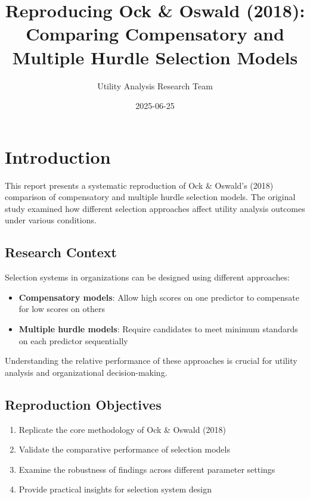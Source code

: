 \documentclass[
]{article}
\title{Reproducing Ock \& Oswald (2018): Comparing Compensatory and
Multiple Hurdle Selection Models}
\author{Utility Analysis Research Team}
\date{2025-06-25}
\providecommand{\tightlist}{%
  \setlength{\itemsep}{0pt}\setlength{\parskip}{0pt}}
\begin{document}
\maketitle

{
\setcounter{tocdepth}{3}
\tableofcontents
}
\section{Introduction}\label{introduction}

This report presents a systematic reproduction of Ock \& Oswald's (2018)
comparison of compensatory and multiple hurdle selection models. The
original study examined how different selection approaches affect
utility analysis outcomes under various conditions.

\subsection{Research Context}\label{research-context}

Selection systems in organizations can be designed using different
approaches:

\begin{itemize}
\tightlist
\item
  \textbf{Compensatory models}: Allow high scores on one predictor to
  compensate for low scores on others
\item
  \textbf{Multiple hurdle models}: Require candidates to meet minimum
  standards on each predictor sequentially
\end{itemize}

Understanding the relative performance of these approaches is crucial
for utility analysis and organizational decision-making.

\subsection{Reproduction Objectives}\label{reproduction-objectives}

\begin{enumerate}
\def\labelenumi{\arabic{enumi}.}
\tightlist
\item
  Replicate the core methodology of Ock \& Oswald (2018)
\item
  Validate the comparative performance of selection models
\item
  Examine the robustness of findings across different parameter settings
\item
  Provide practical insights for selection system design
\end{enumerate}
\end{document}

